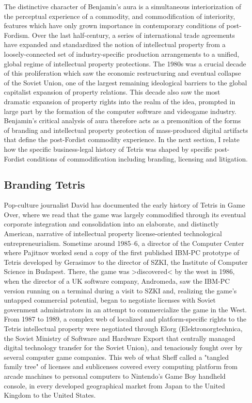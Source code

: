 The distinctive character of Benjamin's aura is a simultaneous interiorization of the perceptual experience of a commodity, and commodification of interiority, features which have only grown importance in contemporary conditions of post-Fordism. Over the last half-century, a series of international trade agreements have expanded and standardized the notion of intellectual property from a loosely-connected set of industry-specific production arrangements to a unified, global regime of intellectual property protections. The 1980s was a crucial decade of this proliferation which saw the economic restructuring and eventual collapse of the Soviet Union, one of the largest remaining ideological barriers to the global capitalist expansion of property relations. This decade also saw the most dramatic expansion of property rights into the realm of the idea, prompted in large part by the formation of the computer software and videogame industry. Benjamin's critical analysis of aura therefore acts as a premonition of the forms of branding and intellectual property protection of mass-produced digital artifacts that define the post-Fordist commodity experience. In the next section, I relate how the specific business-legal history of Tetris was shaped by specific post-Fordist conditions of commodification including branding, licensing and litigation.

\subsection*{Branding Tetris}
Pop-culture journalist David \citeauthor{Sheff1993} has documented the early history of Tetris in Game Over, where we read that the game was largely commodified through its eventual corporate integration and consolidation into an elaborate, and distinctly American, narrative of intellectual property license-oriented technological entrepreneurialism. Sometime around 1985--6, a director of the Computer Center where Pajitnov worked send a copy of the first published IBM-PC prototype of Tetris developed by Gerasimov to the director of SZKI, the Institute of Computer Science in Budapest. There, the game was >discovered< by the west in 1986, when the director of a UK software company, Andromeda, saw the IBM-PC version running on a terminal during a visit to SZKI and, realizing the game's untapped commercial potential, began to negotiate licenses with Soviet government administrators in an attempt to commercialize the game in the West. From 1987 to 1989, a complex web of localized and platform-specific rights to the Tetris intellectual property were negotiated through Elorg (Elektronorgtechnica, the Soviet Ministry of Software and Hardware Export that centrally managed digital technology transfer for the Soviet Union), and tenaciously fought over by several computer game companies. This web of what Sheff called a "tangled family tree" \autocite[310]{Sheff1993} of licenses and sublicenses covered every computing platform from arcade machines to personal computers to Nintendo's Game Boy handheld console, in every developed geographical market from Japan to the United Kingdom to the United States.

